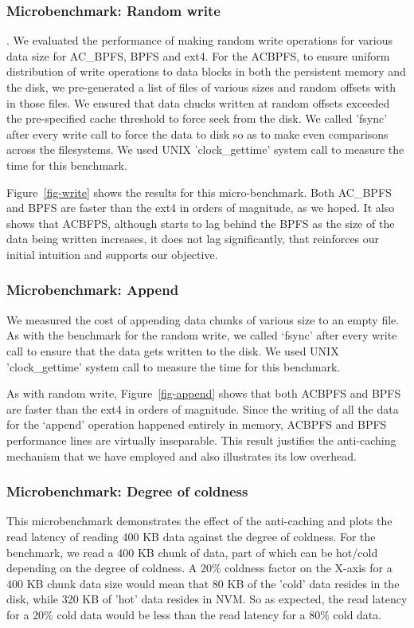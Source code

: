 \subsubsection{Microbenchmark: Random write}
. We evaluated the performance of making random write operations for various data size for AC\_BPFS, BPFS and ext4. For the AC\-BPFS, to ensure uniform distribution of write operations to data blocks in both the persistent memory and the disk, we pre-generated a list of files of various sizes and random offsets with in those files. We ensured that data chucks written at random offsets exceeded the pre-specified cache threshold to force seek from the disk. We called 'fsync' after every write call to force the data to disk so as to make even comparisons across the filesystems. We used UNIX 'clock\_gettime' system call to measure the time for this benchmark.

Figure~\ref{fig-write} shows the results for this micro-benchmark. Both AC\_BPFS and BPFS are faster than the ext4 in orders of magnitude, as we hoped. It also shows that AC\-BFPS, although starts to lag behind the BPFS as the size of the data being written increases, it does not lag significantly, that reinforces our initial intuition and supports our objective.



\subsubsection{Microbenchmark: Append}
We measured the cost of appending data chunks of various size to an empty file. As with the benchmark for the random write, we called ‘fsync’ after every write call to ensure that the data gets written to the disk. We used UNIX 'clock\_gettime' system call to measure the time for this benchmark.

As with random write, Figure~\ref{fig-append}  shows that both AC\-BPFS and BPFS are faster than the ext4 in orders of magnitude. Since the writing of all the data for the ‘append’ operation happened entirely in memory, AC\-BPFS and BPFS performance lines are virtually inseparable. This result justifies the anti-caching mechanism that we have employed and also illustrates its low overhead.


\subsubsection{Microbenchmark: Degree of coldness}
This microbenchmark demonstrates the effect of the anti-caching and plots the read latency of reading 400 KB data against the degree of coldness. For the benchmark, we read a 400 KB chunk of data, part of which can be hot/cold depending on the degree of coldness. A 20\% coldness factor on the X-axis for a 400 KB chunk data size would mean that 80 KB of the 'cold' data resides in the disk, while 320 KB of 'hot' data resides in NVM. So as expected, the read latency for a 20\% cold data would be less than the read latency for a 80\% cold data.\\

